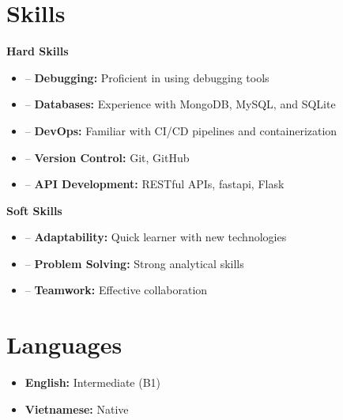 \documentclass[a4paper,12pt]{article}
\newenvironment{itemList}[3][]
    {
    \noindent\hspace{1em}\textbf{#2}\hfill#3\\[3.75pt]
    \begin{minipage}[t]{\linewidth}
    \begin{itemize}[nosep,after=\strut, leftmargin=2em, itemsep=3pt, label={}, #1]
    }
    {
    \end{itemize}
    \end{minipage}
    }
\begin{document}
\section{Skills}
\begin{itemList}[itemsep=5pt]{Hard Skills}{}
    \item -- \textbf{Debugging:} Proficient in using debugging tools
    \item -- \textbf{Databases:} Experience with MongoDB, MySQL, and SQLite
    \item -- \textbf{DevOps:} Familiar with CI/CD pipelines and containerization
    \item -- \textbf{Version Control:} Git, GitHub
    \item -- \textbf{API Development:} RESTful APIs, fastapi, Flask
\end{itemList}

\begin{itemList}[itemsep=5pt]{Soft Skills}{}
    \item -- \textbf{Adaptability:} Quick learner with new technologies
    \item -- \textbf{Problem Solving:} Strong analytical skills
    \item -- \textbf{Teamwork:} Effective collaboration
\end{itemList}

\section{Languages}
\begin{itemize}[nosep,after=\strut, leftmargin=1em, itemsep=4pt, label={}]
    \item \textbf{English:} Intermediate (B1)
    \item \textbf{Vietnamese:} Native
\end{itemize}

\vfill
{}
\end{document}
